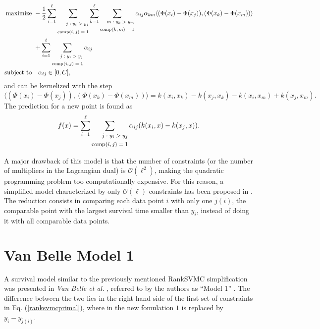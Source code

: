 \documentclass[12pt]{report}
\begin{document}
\begin{equation} \label{ranksvmcdual}
\begin{split}
\text{maximize} &\
-\dfrac{1}{2}\sum_{i=1}^{\ell}\sum_{\scriptsize\begin{split} j:y_{i} > y_{j} \\ \text{comp}(i,j) = 1 \end{split}}\sum_{k=1}^{\ell}\sum_{\scriptsize\begin{split} m:y_{k} > y_{m} \\ \text{comp}(k,m) = 1 \end{split}}\alpha_{ij}\alpha_{km}\langle (\Phi(x_{i}) - \Phi(x_{j})),(\Phi(x_{k}) - \Phi(x_{m}))\rangle \\ &\ + \sum_{i=1}^{\ell}\sum_{\scriptsize\begin{split} j:y_{i} > y_{j} \\ \text{comp}(i,j) = 1 \end{split}}\alpha_{ij} \\
\text{subject to} &\quad \alpha_{ij} \in [0,C] \text{,}
\end{split}
\end{equation}
and can be kernelized with the step
\begin{equation} \label{ranksvmckern}
\langle (\Phi(x_{i}) - \Phi(x_{j})),(\Phi(x_{k}) - \Phi(x_{m}))\rangle = k(x_{i},x_{k})-k(x_{j},x_{k})-k(x_{i},x_{m})+k(x_{j},x_{m}) \text{.}
\end{equation}
The prediction for a new point is found as
\begin{equation} \label{ranksvmcf}
f(x) = \sum_{i=1}^{\ell}\sum_{\footnotesize\begin{split} j:y_{i} > y_{j} \\ \text{comp}(i,j) = 1 \end{split}}\alpha_{ij}(k(x_{i},x) - k(x_{j},x)) \text{.}
\end{equation}

A major drawback of this model is that the number of constraints (or the number of multipliers in the Lagrangian dual) is $\mathcal{O}(\ell^{2})$, making the quadratic programming problem too computationally expensive. For this reason, a simplified model characterized by only $\mathcal{O}(\ell)$ constraints has been proposed in \cite{vanbelle08}. The reduction consists in comparing each data point $i$ with only one $\overline{j}(i)$, the comparable point with the largest survival time smaller than $y_{i}$, instead of doing it with all comparable data points.

\section{Van Belle Model 1}
A survival model similar to the previously mentioned RankSVMC simplification was presented in \textit{Van Belle et al.} \cite{vanbelle11b}, referred to by the authors as ``Model 1'' \cite{vanbelle11}. The difference between the two lies in the right hand side of the first set of constraints in Eq. (\ref{ranksvmcprimal}), where in the new fomulation $1$ is replaced by $y_{i} - y_{\overline{j}(i)}$.
\end{document}
